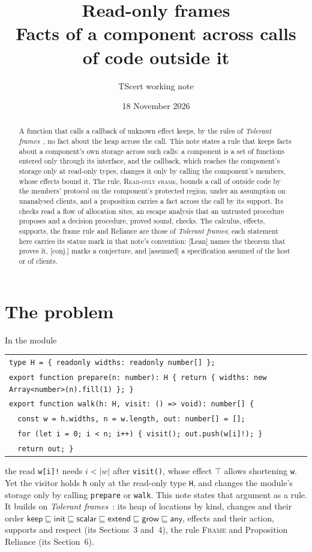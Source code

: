 \documentclass[10pt,a4paper]{article}
\title{Read-only frames\\[2pt]\large Facts of a component across calls of code outside it}
\author{TScert working note}
\date{18 November 2026}
\theoremstyle{definition}
\theoremstyle{remark}
\newcommand{\kw}[1]{\mathsf{#1}}
\newcommand{\keep}{\kw{keep}}
\newcommand{\init}{\kw{init}}
\newcommand{\extend}{\kw{extend}}
\newcommand{\grow}{\kw{grow}}
\newcommand{\any}{\kw{any}}
\newcommand{\len}[1]{|#1|}
\newcommand{\code}[1]{\texttt{#1}}
\newcommand{\status}[1]{\textsf{\small[#1]}}
\begin{document}
\maketitle

\begin{abstract}
\noindent
A function that calls a callback of unknown effect keeps, by the rules of
\emph{Tolerant frames}~\cite{tf}, no fact about the heap across the call.
This note states a rule that keeps facts about a component's own storage
across such calls: a component is a set of functions entered only through
its interface, and the callback, which reaches the component's storage
only at read-only types, changes it only by calling the component's
members, whose effects bound it. The rule, \textsc{Read-only frame},
bounds a call of outside code by the members' protocol on the component's
protected region, under an assumption on unanalysed clients, and a
proposition carries a fact across the call by its support. Its checks read
a flow of allocation sites, an escape analysis that an untrusted procedure
proposes and a decision procedure, proved sound, checks. The calculus,
effects, supports, the frame rule and Reliance are those of
\emph{Tolerant frames}; each statement here carries its status mark in
that note's convention: \status{Lean} names the theorem that proves it,
\status{conj.} marks a conjecture, and \status{assumed} a specification
assumed of the host or of clients.
\end{abstract}

\section{The problem}\label{sec:problem}

In the module
\begin{center}\small
\begin{tabular}{@{}l@{}}
\code{type H = \{ readonly widths: readonly number[] \};}\\
\code{export function prepare(n: number): H \{ return \{ widths: new Array<number>(n).fill(1) \}; \}}\\
\code{export function walk(h: H, visit: () => void): number[] \{}\\
\code{~~const w = h.widths, n = w.length, out: number[] = [];}\\
\code{~~for (let i = 0; i < n; i++) \{ visit(); out.push(w[i]!); \}}\\
\code{~~return out; \}}
\end{tabular}
\end{center}
the read \code{w[i]!} needs $i<\len w$ after \code{visit()}, whose
effect $\top$ allows shortening \code{w}. Yet the visitor holds \code{h}
only at the read-only type \code{H}, and changes the module's storage
only by calling \code{prepare} or \code{walk}. This note states that
argument as a rule. It builds on \emph{Tolerant frames}~\cite{tf}: its
heap of locations by kind, changes and their order
$\keep\sqsubseteq\init\sqsubseteq\kw{scalar}\sqsubseteq\extend\sqsubseteq\grow\sqsubseteq\any$,
effects and their action, supports and respect (its Sections~3 and~4),
the rule \textsc{Frame} and Proposition Reliance (its Section~6).
\end{document}
